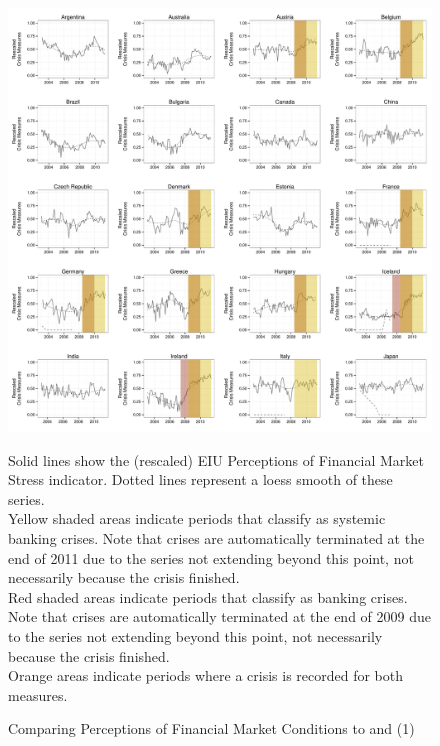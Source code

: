 \documentclass[]{article}
\begin{document}
\begin{figure}
    \caption{Comparing Perceptions of Financial Market Conditions to \cite{laeven2013} and \cite{Reinhart2009} (1)}
    \label{compare_1}
    \begin{center}
        \includegraphics[scale=0.4]{figures/compare_to_lv_rr.pdf}
    \end{center}

    {\tiny{Solid lines show the (rescaled) EIU Perceptions of Financial Market Stress indicator. Dotted lines represent a loess smooth of these series. \\

    Yellow shaded areas indicate periods that \cite{laeven2013} classify as systemic banking crises. Note that crises are automatically terminated at the end of 2011 due to the series not extending beyond this point, not necessarily because the crisis finished. \\

    Red shaded areas indicate periods that \cite{Reinhart2009} classify as banking crises. Note that crises are automatically terminated at the end of 2009 due to the series not extending beyond this point, not necessarily because the crisis finished. \\

    Orange areas indicate periods where a crisis is recorded for both measures.}}
\end{figure}
\end{document}
